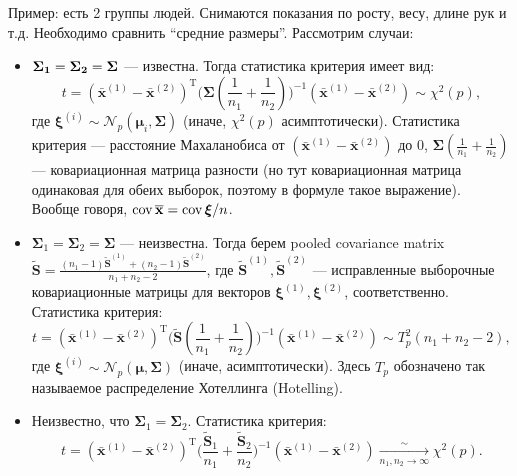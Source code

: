 Пример: есть 2 группы людей. Снимаются показания по росту, весу, длине рук и т.д. Необходимо сравнить ``средние размеры''. Рассмотрим случаи:
\begin{itemize}
\item $\bf\Sigma_1 = \bf\Sigma_2 = \bf\Sigma$ --- известна. Тогда статистика критерия имеет вид:
%
\begin{equation*}
t = (\bar{\mathbf{x}}^{(1)} - \bar{\mathbf{x}}^{(2)})^{\mathrm{T}} \Big (\bm\Sigma (\frac{1}{n_1} + \frac{1}{n_2}) \Big )^{-1} (\bar{\mathbf{x}}^{(1)} - \bar{\mathbf{x}}^{(2)}) \sim \chi^2 (p),
\end{equation*}
%
где $\bm\xi^{(i)} \sim \mathcal{N}_p (\bm\mu_i,\bm\Sigma)$ (иначе, $\chi^2 (p)$ асимптотически). Статистика критерия --- расстояние Махаланобиса от $(\bar{\mathbf{x}}^{(1)} - \bar{\mathbf{x}}^{(2)})$ до 0, $\bm\Sigma (\frac{1}{n_1} + \frac{1}{n_2})$ --- ковариационная матрица разности (но тут ковариационная матрица одинаковая для обеих выборок, поэтому в формуле такое выражение). Вообще говоря, $\operatorname{cov} \overline{\mathbf{x}} = \operatorname{cov} \bm\xi/n$.

\item $\bm\Sigma_1 = \bm\Sigma_2 = \bm\Sigma$ --- неизвестна. Тогда берем pooled covariance matrix $\tilde{\mathbf{S}} = \frac{(n_1 - 1)\tilde{\mathbf{S}}^{(1)} + (n_2 - 1)\tilde{\mathbf{S}}^{(2)}}{n_1 + n_2 - 2}$, где $\tilde{\mathbf{S}}^{(1)}, \tilde{\mathbf{S}}^{(2)}$ --- исправленные выборочные ковариационные матрицы для векторов $\bm\xi^{(1)}, \bm\xi^{(2)}$, соответственно.
Статистика критерия:
%
\begin{equation*}
t = (\bar{\mathbf{x}}^{(1)} - \bar{\mathbf{x}}^{(2)})^{\mathrm{T}} \Big (\tilde{\mathbf{S}} (\frac{1}{n_1} +
\frac{1}{n_2}) \Big )^{-1} (\bar{\mathbf{x}}^{(1)} - \bar{\mathbf{x}}^{(2)}) \sim T_p^2 (n_1+n_2-2),
\end{equation*}
%
где $\bm\xi^{(i)} \sim \mathcal{N}_p (\bm\mu,\bm\Sigma)$ (иначе, асимптотически). Здесь $T_p$ обозначено так называемое распределение Хотеллинга (Hotelling).

\item Неизвестно, что $\bm\Sigma_1 = \bm\Sigma_2$. 
Статистика критерия:
%
\begin{equation*}
t = (\bar{\mathbf{x}}^{(1)} - \bar{\mathbf{x}}^{(2)})^{\mathrm{T}} \Big (\frac{\tilde{\mathbf{S}}_1}{n_1} +
\frac{\tilde{\mathbf{S}}_2}{n_2} \Big )^{-1} (\bar{\mathbf{x}}^{(1)} - \bar{\mathbf{x}}^{(2)}) \xrightarrow[n_1, n_2
\rightarrow \infty]{\sim} \chi^2 (p).
\end{equation*}
%
\end{itemize}

